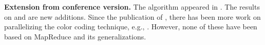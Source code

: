 \noindent
\textbf{Extension from conference version.} The \sahad{} algorithm appeared in 
\cite{zhao2012sahad}. The results on \ensahad{} and \harpsahad{} are new additions.
Since the publication of \cite{zhao2012sahad}, there has been more work on
parallelizing the color coding technique, e.g., \cite{slota2013fast, slota2015parallel}.
However, none of these have been based on MapReduce and its generalizations.



%
%



%
%


